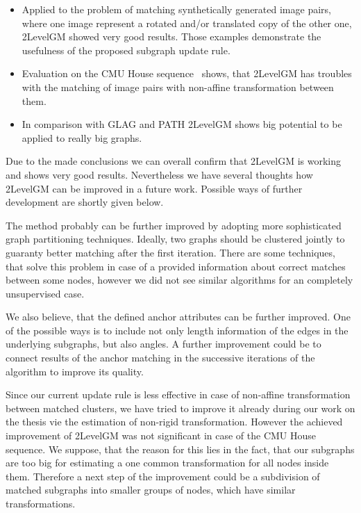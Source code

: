 \begin{itemize}
\item Applied to the problem of matching synthetically generated image pairs, where one image represent a rotated and/or translated copy of the other one, 2LevelGM showed very good results.
Those examples demonstrate the usefulness of the proposed subgraph update rule.
\item Evaluation on the CMU House sequence~\cite{CMUHouse} shows, that 2LevelGM has troubles with the matching of image pairs with non-affine transformation between them.
\item In comparison with GLAG and PATH 2LevelGM shows big potential to be applied to really big graphs.
\end{itemize}

Due to the made conclusions we can overall confirm that 2LevelGM is working and shows very good results. Nevertheless we have several thoughts how 2LevelGM can be improved in a future work. Possible ways of further development are shortly given below.
 
The method probably can be further improved by adopting more sophisticated graph partitioning techniques. Ideally, two graphs should be clustered jointly to guaranty better matching after the first iteration. There are some techniques, that solve this problem in case of a provided information about correct matches between some nodes, however we did not see similar algorithms for an completely unsupervised case.

We also believe, that the defined anchor attributes can be further improved. One of the possible ways is to include not only length information of the edges in the underlying subgraphs, but also angles. A further improvement could be to connect results of the anchor matching in the successive iterations of the algorithm to improve its quality.

Since our current update rule is less effective in case of non-affine transformation between matched clusters, we have tried to improve it already during our work on the thesis vie the estimation of non-rigid transformation. However the achieved improvement of 2LevelGM was not significant in case of the CMU House sequence. We suppose, that the reason for this lies in the fact, that our subgraphs are too big for estimating a one common transformation for all nodes inside them. Therefore a next step of the improvement could be a subdivision of matched subgraphs into smaller groups of nodes, which have similar transformations.

